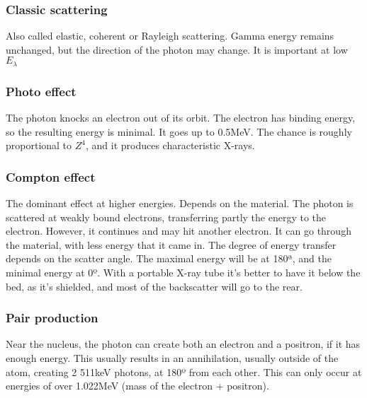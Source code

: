 \subsubsection{Classic scattering}
Also called elastic, coherent or Rayleigh scattering.
Gamma energy remains unchanged, but the direction of the photon may change. It is important at low $E_{\lambda}$

\subsubsection{Photo effect}
The photon knocks an electron out of its orbit. The electron has binding energy, so the resulting energy is minimal. It goes up to 0.5MeV. The chance is roughly proportional to $Z^4$, and it produces characteristic X-rays.

\subsubsection{Compton effect}
The dominant effect at higher energies. Depends on the material.
The photon is scattered at weakly bound electrons, transferring partly the energy to the electron. However, it continues and may hit another electron. It can go through the material, with less energy that it came in.
The degree of energy transfer depends on the scatter angle. The maximal energy will be at 180ª, and the minimal energy at 0º. With a portable X-ray tube it's better to have it below the bed, as it's shielded, and most of the backscatter will go to the rear.

\subsubsection{Pair production}
Near the nucleus, the photon can create both an electron and a positron, if it has enough energy. This usually results in an annihilation, usually outside of the atom, creating 2 511keV photons, at 180º from each other. This can only occur at energies of over 1.022MeV (mass of the electron + positron). 

